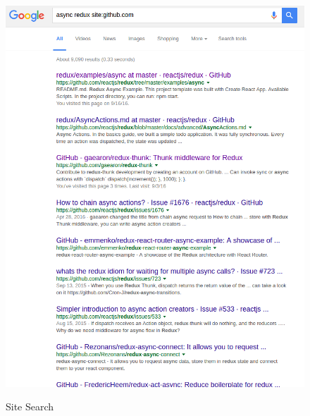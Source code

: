 \documentclass[a4paper,11pt]{article}
\begin{document}
\begin{figure}[h]
%
  {\includegraphics[scale=0.5]{googleSiteSearch.png}}
\caption{Site Search}
\label{fig:ssearch}
\end{figure}
\end{document}
